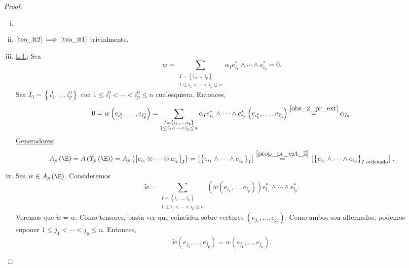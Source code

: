 \begin{proof}
    \begin{enumerate}[i)]
    \item[]
    \item
        $%
        \ref{teo_it2} \implies%
        \ref{teo_it1} $ trivialmente.
    \item
        \underline{L.I.}:  Sea
        \[
            w=\sum_{\substack{I=\left\{ i_1, \dots , i_p \right\} \\
            1\leq i_1 < \cdots < i_p \leq n}} \alpha _I e_{i_1}^* \wedge
            \cdots \wedge e_{i_p}^*=0.
        \]
        Sea $ I_0=\left\{ i_1^0, \dots , i_p^0 \right\} $ con $ 1\leq i_1^0
        < \cdots < i_p^0 \leq n $ cualesquiera.  Entonces,
        \[
            0=w \left( e_{i_1^0} , \dots , e_{i_p^0} \right)= \sum_{\substack
            {I=\left\{ i_1, \dots , i_p \right\} \\
            1\leq i_1 < \cdots < i_p \leq n}} \alpha _I e_{i_1}^* \wedge
            \cdots \wedge e_{i_p}^* \left( e_{i_1^0} , \dots , e_{i_p^0}
            \right) \stackrel{%
            \ref{obs_2_pr_ext}} = \alpha _ {I_0}.
        \]
        \underline{Generadores}:
        \[
            A_p \left( \E \right) = A \left( T_p \left( \E \right)
            \right) = A_p \left( \left[ e_{i_1} \otimes \cdots \otimes e_
            {i_p} \right]_I \right) = \left[ \left\{ e_{i_1} \wedge
            \cdots \wedge e_{i_p} \right\}_I \right] \stackrel{%
            \ref{prop_pr_ext_ii}}= \left[ \left\{ e_{i_1} \wedge \cdots
            \wedge e_{i_p} \right\}_{I\text{ ordenado}} \right].
        \]
    \item
        Sea $ w \in A_p\left(\E\right) $.  Consideremos
        \[
            \tilde{w}=\sum_{\substack{I=\left\{ i_1, \dots , i_p \right\}
            \\
            1\leq i_1 < \cdots < i_p \leq n}} \left( w \left( e_{i_1} ,
            \dots , e_{i_p} \right) \right) e_{i_1}^* \wedge \cdots
            \wedge e_{i_p}^*.
        \]
        Veremos que $ \tilde{w}=w $.  Como tensores, basta ver que
        coinciden sobre vectores $ \left( e_{j_1}, \dots , e_{j_p}
        \right) $.  Como ambos son alternados, podemos suponer $ 1 \leq
        j_1 < \cdots < j_p \leq n $.  Entonces,
        \[
            \tilde{w} \left( e_{j_1}, \dots , e_{j_p} \right) = w \left(
            e_{j_1}, \dots , e_{j_p} \right).
        \]

\end{enumerate}
\end{proof}

